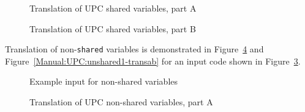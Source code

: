 \begin{figure}[!h]
{\indent
  {\mySmallFontSize
    \begin{latexonly}
    
    \end{latexonly}
    \begin{htmlonly}
    
    \end{htmlonly}
  }
}
\caption{Translation of UPC shared variables, part A}
\label{Manual:UPC:shared1-transaa}
\end{figure}

\begin{figure}[!h]
{\indent
  {\mySmallFontSize
    \begin{latexonly}
    
    \end{latexonly}
    \begin{htmlonly}
    
    \end{htmlonly}
  }
}
\caption{Translation of UPC shared variables, part B}
\label{Manual:UPC:shared1-transab}
\end{figure}


\clearpage
Translation of non-\lstinline{shared} variables is demonstrated in
Figure~\ref{Manual:UPC:unshared1-transaa} and
Figure~\ref{Manual:UPC:unshared1-transab} for an input code shown in
Figure~\ref{Manual:UPC:unshared1}.

\begin{figure}[!h]
{\indent
  {\mySmallFontSize
    \begin{latexonly}
    
    \end{latexonly}
    \begin{htmlonly}
    
    \end{htmlonly}
  }
}
\caption{Example input for non-shared variables}
\label{Manual:UPC:unshared1}
\end{figure}

\begin{figure}[!h]
{\indent
  {\mySmallFontSize
    \begin{latexonly}
    
    \end{latexonly}
    \begin{htmlonly}
    
    \end{htmlonly}
  }
}
\caption{Translation of UPC non-shared variables, part A}
\label{Manual:UPC:unshared1-transaa}
\end{figure}

